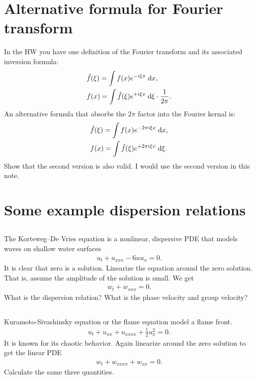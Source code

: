 \documentclass[11pt,letterpaper]{article}
\begin{document}
\section{Alternative formula for Fourier transform}
In the HW you have one definition of the Fourier transform and its associated inversion formula:
\begin{align}
    &\hat f(\xi) = \int f(x)e^{-i\xi x} \;\mathrm{d} x,\\
    &f(x) = \int \hat f(\xi)e^{+i\xi x} \;\mathrm{d} \xi \cdot\frac{1}{2\pi}.
\end{align}
An alternative formula that absorbs the $2\pi$ factor into the Fourier kernal is:
\begin{align}
    &\hat f(\xi ) = \int f(x)e^{-2\pi i\xi x} \;\mathrm{d} x,\\
    &f(x) = \int \hat f(\xi)e^{+2\pi i \xi x} \;\mathrm{d} \xi \label{eq:Four_inv}.
\end{align}
Show that the second version is also valid. I would use the second version in this note.

\section{Some example dispersion relations}
\subsection{}
The Korteweg–De Vries equation is a nonlinear, dispersive PDE that models waves on shallow water surfaces
\begin{align}
    u_t+u_{xxx}-6uu_x = 0.
\end{align}
It is clear that zero is a solution. Linearize the equation around the zero solution. That is, assume the amplitude of the solution is small. We get
\begin{align}
    w_t+w_{xxx} = 0.
\end{align}
What is the dispersion relation? What is the phase velocity and group velocity?

\subsection{}
Kuramoto-Sivashinsky equation or the flame equation model a flame front. 
\begin{align}
    u_t+u_{xx}+u_{xxxx}+\frac{1}{2}u_x^2 = 0.
\end{align}
It is known for its chaotic behavior. Again linearize around the zero solution to get the linear PDE
\begin{align}
    w_t+w_{xxxx}+w_{xx} = 0.
\end{align}
Calculate the same three quantities.
\end{document}
